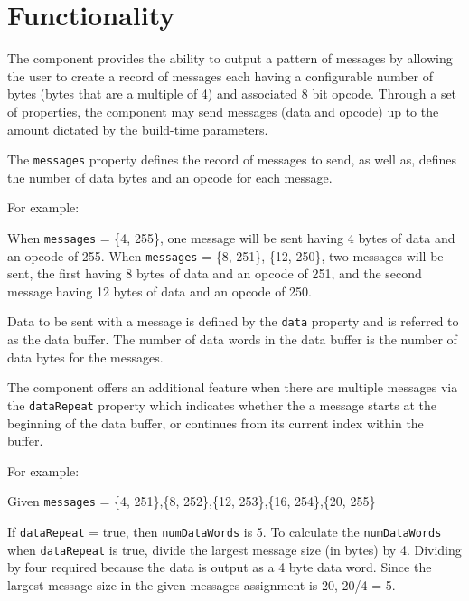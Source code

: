 \section*{Functionality}
\begin{flushleft}

The {\comp} component provides the ability to output a pattern of messages by allowing the user to create a record of messages each having a configurable number of bytes (bytes that are a multiple of 4) and associated 8 bit opcode. Through a set of properties, the component may send messages (data and opcode) up to the amount dictated by the build-time parameters. \newline

The \texttt{messages} property defines the record of messages to send, as well as, defines the number of data bytes and an opcode for each message. \newline

For example: \newline

When \texttt{messages} = \{4, 255\}, one message will be sent having 4 bytes of data and an opcode of 255. \newline
When \texttt{messages} = \{8, 251\}, \{12, 250\}, two messages will be sent, the first having 8 bytes of data and an opcode of 251, and the second message having 12 bytes of data and an opcode of 250. \newline

Data to be sent with a message is defined by the \texttt{data} property and is referred to as the data buffer. The number of data words in the data buffer is the number of data bytes for the messages. \newline

The component offers an additional feature when there are multiple messages via the \texttt{dataRepeat} property which indicates whether the a message starts at the beginning of the data buffer, or continues from its current index within the buffer. \newline

For example: \newline

Given \texttt{messages} = \{4, 251\},\{8, 252\},\{12, 253\},\{16, 254\},\{20, 255\} \newline

If \texttt{dataRepeat} = true, then \texttt{numDataWords} is 5. To calculate the \texttt{numDataWords} when \texttt{dataRepeat} is true, divide the largest message size (in bytes) by 4. Dividing by four required because the data is output as a 4 byte data word. Since the largest message size in the given messages assignment is 20, 20/4 = 5. \newline


\end{flushleft}
